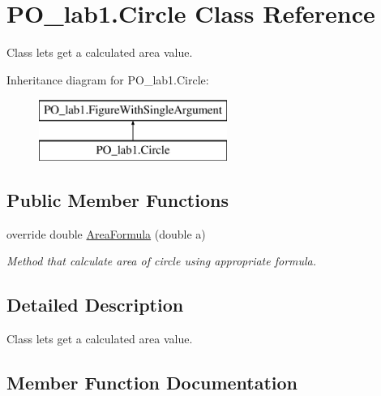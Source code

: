 \hypertarget{class_p_o__lab1_1_1_circle}{}\section{P\+O\+\_\+lab1.\+Circle Class Reference}
\label{class_p_o__lab1_1_1_circle}


Class lets get a calculated area value.  


Inheritance diagram for P\+O\+\_\+lab1.\+Circle\+:\begin{figure}[H]
\begin{center}
\leavevmode
\includegraphics[height=2.000000cm]{class_p_o__lab1_1_1_circle}
\end{center}
\end{figure}
\subsection*{Public Member Functions}
\begin{DoxyCompactItemize}
\item 
override double \mbox{\hyperlink{class_p_o__lab1_1_1_circle_a7eae9033be9ad780426b927e6f841eb8}{Area\+Formula}} (double a)
\begin{DoxyCompactList}\small\item\em Method that calculate area of circle using appropriate formula. \end{DoxyCompactList}\end{DoxyCompactItemize}


\subsection{Detailed Description}
Class lets get a calculated area value. 



\subsection{Member Function Documentation}
\mbox{\label{class_p_o__lab1_1_1_circle_a7eae9033be9ad780426b927e6f841eb8}} 
